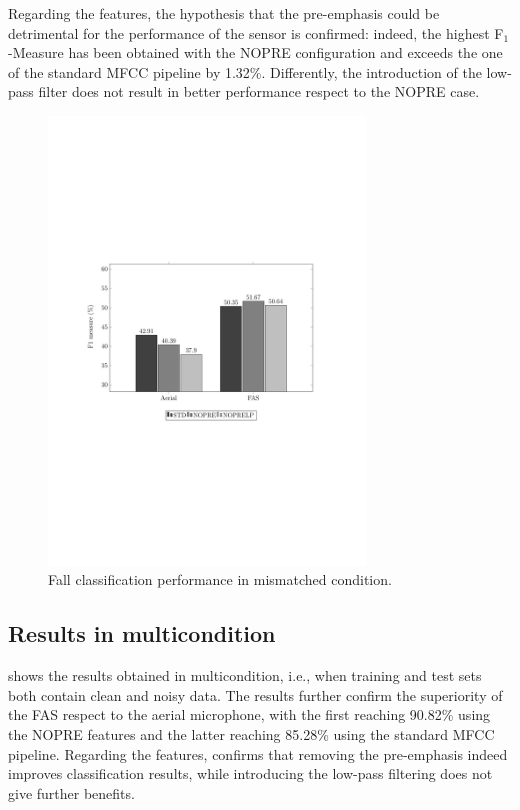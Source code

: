 Regarding the features, the hypothesis that the pre-emphasis could be detrimental for the performance of the sensor is confirmed: indeed, the highest F$_1$-Measure has been obtained with the NOPRE configuration and exceeds the one of the standard MFCC pipeline by 1.32\%. Differently, the introduction of the low-pass filter does not result in better performance respect to the NOPRE case. %

\begin{figure}[t]
	\centering
	\includegraphics[width=0.75\textwidth]{img/pgfsources/16_mismatched/16_mismatched}
	\caption{Fall classification performance in mismatched condition.} \label{fig:results_mismatch}
\end{figure}

\subsection{Results in multicondition}
 shows the results obtained in multicondition, i.e., when training and test sets both contain clean and noisy data. The results further confirm the superiority of the FAS respect to the aerial microphone, with the first reaching 90.82\% using the NOPRE features and the latter reaching 85.28\% using the standard MFCC pipeline. Regarding the features,  confirms that removing the pre-emphasis indeed improves classification results, while introducing the low-pass filtering does not give further benefits.

